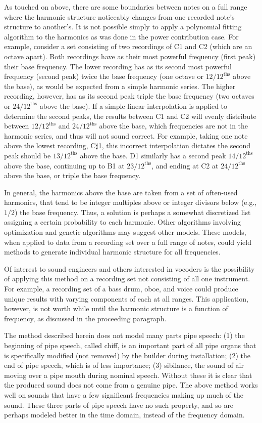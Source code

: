 \documentclass[twocolumn]{article}
\begin{document}
As touched on above, there are some boundaries between notes on a full range where the harmonic structure noticeably changes from one recorded note's structure to another's. It is not possible simply to apply a polynomial fitting algorithm to the harmonics as was done in the power contribution case. For example, consider a set consisting of two recordings of C1 and C2 (which are an octave apart). Both recordings have as their most powerful frequency (first peak) their base frequency. The lower recording has as its second most powerful frequency (second peak) twice the base frequency (one octave or $12/12^\mathrm{ths}$ above the base), as would be expected from a simple harmonic series. The higher recording, however, has as its second peak triple the base frequency (two octaves or $24/12^\mathrm{ths}$ above the base). If a simple linear interpolation is applied to determine the second peaks, the results between C1 and C2 will evenly distribute between $12/12^\mathrm{ths}$ and $24/12^\mathrm{ths}$ above the base, which frequencies are not in the harmonic series, and thus will not sound correct. For example, taking one note above the lowest recording, C$\sharp$1, this incorrect interpolation dictates the second peak should be $13/12^\mathrm{ths}$ above the base. D1 similarly has a second peak $14/12^\mathrm{ths}$ above the base, continuing up to B1 at $23/12^\mathrm{ths}$, and ending at C2 at $24/12^\mathrm{ths}$ above the base, or triple the base frequency.

In general, the harmonics above the base are taken from a set of often-used harmonics, that tend to be integer multiples above or integer divisors below (e.g., $1/2$) the base frequency. Thus, a solution is perhaps a somewhat discretized list assigning a certain probability to each harmonic. Other algorithms involving optimization and genetic algorithms may suggest other models. These models, when applied to data from a recording set over a full range of notes, could yield methods to generate individual harmonic structure for all frequencies.

Of interest to sound engineers and others interested in vocoders is the possibility of applying this method on a recording set not consisting of all one instrument. For example, a recording set of a bass drum, oboe, and voice could produce unique results with varying components of each at all ranges. This application, however, is not worth while until the harmonic structure is a function of frequency, as discussed in the proceeding paragraph.

The method described herein does not model many parts pipe speech: (1) the beginning of pipe speech, called chiff, is an important part of all pipe organs that is specifically modified (not removed) by the builder during installation; (2) the end of pipe speech, which is of less importance; (3) sibilance, the sound of air moving over a pipe mouth during nominal speech. Without these it is clear that the produced sound does not come from a genuine pipe. The above method works well on sounds that have a few significant frequencies making up much of the sound. These three parts of pipe speech have no such property, and so are perhaps modeled better in the time domain, instead of the frequency domain.
\end{document}
